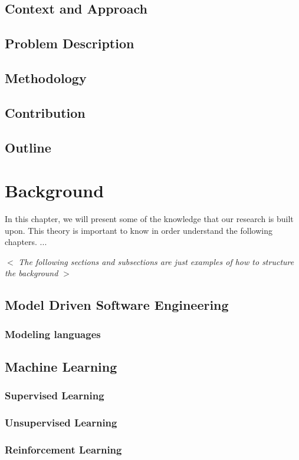 \documentclass[a4paper]{report}
\begin{document}
\section{Context and Approach}
\section{Problem Description}
\section{Methodology}
\section{Contribution}
\section{Outline}

\chapter{Background} \label{Background}
In this chapter, we will present some of the knowledge that our research is built upon. This theory is important to know in order understand the following chapters.
...

$<$ \textit{The following sections and subsections are just examples of how to structure the background} $>$
\section{Model Driven Software Engineering}
\subsection{Modeling languages}\label{ModelingLanguages}

\section{Machine Learning} \label{Machine Learning}
\subsection{Supervised Learning}
\subsection{Unsupervised Learning}
\subsection{Reinforcement Learning}
\end{document}
